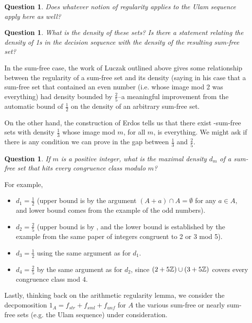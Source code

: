 \documentclass{article}
\newtheorem{question}[theorem]{Question}
\theoremstyle{definition}
\theoremstyle{remark}
\numberwithin{equation}{section}
\begin{document}
\begin{question}\label{qn:sumfree_regularity}
  Does whatever notion of regularity applies to the Ulam sequence
  apply here as well?
\end{question}

\begin{question}\label{qn:sumfree_density}
  What is the density of these sets?  Is there a statement relating
  the density of 1s in the decision sequence with the density of the
  resulting sum-free set?
\end{question}

In the sum-free case, the work of Luczak outlined above gives some
relationship between the regularity of a sum-free set and its density
(saying in his case that a sum-free set that contained an even number
(i.e. whose image mod 2 was everything) had density bounded by
$\frac25$--a meaningful improvement from the automatic bound of
$\frac12$ on the density of an arbitrary sum-free set.

On the other hand, the construction of Erdos tells us that there exist
-sum-free sets with density $\frac13$ whose image mod $m$, for all $m$,
is everything.  We might ask if there is any condition we can prove in
the gap between $\frac13$ and $\frac25$.  

\begin{question}\label{qn:irregularity_density}
  If $m$ is a positive integer, what is the maximal density $d_m$ of a
  sum-free set that hits every congruence class modulo $m$?
\end{question}

For example, 

\begin{itemize}
\item $d_1 = \frac12$ (upper bound is by the argument $(A + a) \cap A =
  \emptyset$ for any $a\in A$, and lower bound comes from the example
  of the odd numbers).
\item $d_2 = \frac25$ (upper bound is by
  \cite{sumfree_regularity_luczak}, and the lower bound is established
  by the example from the same paper of integers congruent to 2 or 3
  mod 5).
\item $d_3 = \frac12$ using the same argument as for $d_1$.
\item $d_4 = \frac25$ by the same argument as for $d_2$, since
  $(2+5\mathbb{Z}) \cup (3+5\mathbb{Z})$ covers every congruence class mod 4.
\end{itemize}

Lastly, thinking back on the arithmetic regularity lemma, we consider
the decpomosition $1_A = f_{str} + f_{sml} + f_{unf}$ for $A$ the
various sum-free or nearly sum-free sets (e.g. the Ulam sequence)
under consideration.  
\end{document}
